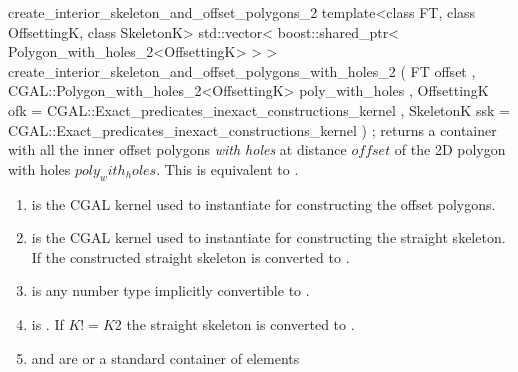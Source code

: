 \begin{ccRefFunction}{create_interior_skeleton_and_offset_polygons_2}
\ccFunction
{template<class FT, class OffsettingK, class SkeletonK>
std::vector< boost::shared_ptr< Polygon_with_holes_2<OffsettingK> > >
create_interior_skeleton_and_offset_polygons_with_holes_2 
  ( FT offset
  , CGAL::Polygon_with_holes_2<OffsettingK> poly_with_holes
  , OffsettingK ofk = CGAL::Exact_predicates_inexact_constructions_kernel
  , SkeletonK ssk   = CGAL::Exact_predicates_inexact_constructions_kernel
  ) ;
}
{returns a container with all the inner offset polygons {\em with holes} at distance $offset$ of the 2D polygon with holes $poly_with_holes$.
This is equivalent to .}

\begin{enumerate}  
   \item    {} is the CGAL kernel used to instantiate
                             for constructing 
                            the offset polygons.
   \item    {} is the CGAL kernel used to instantiate
                             for constructing 
                            the straight skeleton.
                            If  the constructed straight skeleton
                            is converted to .
   \item    {} is any number type implicitly convertible to .
   \item    {} is . 
            If $K != K2$ the straight skeleton is converted to .
   \item    {} and  are 
            or a standard container of  elements 
\end{enumerate}

\ccSeeAlso
{}\\
 \\

\end{ccRefFunction}


